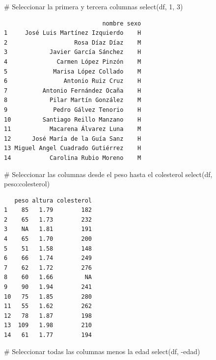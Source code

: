 \documentclass[
  a4paper,
]{scrreport}
\newenvironment{Shaded}{\begin{snugshade}}{\end{snugshade}}
\newcommand{\CommentTok}[1]{\textcolor[rgb]{0.37,0.37,0.37}{#1}}
\newcommand{\DecValTok}[1]{\textcolor[rgb]{0.68,0.00,0.00}{#1}}
\newcommand{\FunctionTok}[1]{\textcolor[rgb]{0.28,0.35,0.67}{#1}}
\newcommand{\NormalTok}[1]{\textcolor[rgb]{0.00,0.23,0.31}{#1}}
\newcommand{\SpecialCharTok}[1]{\textcolor[rgb]{0.37,0.37,0.37}{#1}}
\theoremstyle{definition}
\theoremstyle{definition}
\theoremstyle{remark}
\begin{document}
\begin{Shaded}
\begin{Highlighting}[]
\CommentTok{\# Seleccionar la primera y tercera columnas}
\FunctionTok{select}\NormalTok{(df, }\DecValTok{1}\NormalTok{, }\DecValTok{3}\NormalTok{)}
\end{Highlighting}
\end{Shaded}

\begin{verbatim}
                            nombre sexo
1     José Luis Martínez Izquierdo    H
2                   Rosa Díaz Díaz    M
3            Javier García Sánchez    H
4              Carmen López Pinzón    M
5             Marisa López Collado    M
6                Antonio Ruiz Cruz    H
7          Antonio Fernández Ocaña    H
8            Pilar Martín González    M
9             Pedro Gálvez Tenorio    H
10         Santiago Reillo Manzano    H
11           Macarena Álvarez Luna    M
12      José María de la Guía Sanz    H
13 Miguel Angel Cuadrado Gutiérrez    H
14           Carolina Rubio Moreno    M
\end{verbatim}

\begin{Shaded}
\begin{Highlighting}[]
\CommentTok{\# Seleccionar las columnas desde el peso hasta el colesterol}
\FunctionTok{select}\NormalTok{(df, peso}\SpecialCharTok{:}\NormalTok{colesterol)}
\end{Highlighting}
\end{Shaded}

\begin{verbatim}
   peso altura colesterol
1    85   1.79        182
2    65   1.73        232
3    NA   1.81        191
4    65   1.70        200
5    51   1.58        148
6    66   1.74        249
7    62   1.72        276
8    60   1.66         NA
9    90   1.94        241
10   75   1.85        280
11   55   1.62        262
12   78   1.87        198
13  109   1.98        210
14   61   1.77        194
\end{verbatim}

\begin{Shaded}
\begin{Highlighting}[]
\CommentTok{\# Seleccionar todas las columnas menos la edad}
\FunctionTok{select}\NormalTok{(df, }\SpecialCharTok{{-}}\NormalTok{edad)}
\end{Highlighting}
\end{Shaded}
\end{document}
